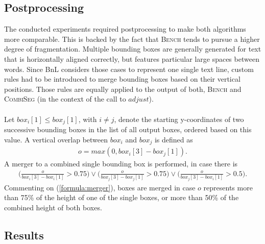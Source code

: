 \documentclass{jdmdh}
\begin{document}
\subsection{Postprocessing} \label{section:post}
The conducted experiments required postprocessing to make both algorithms more comparable. This is backed by the fact that \textsc{Bench} tends to pursue a higher degree of fragmentation. Multiple bounding boxes are generally generated for text that is horizontally aligned correctly, but features particular large spaces between words. Since BnL considers those cases to represent one single text line, custom rules had to be introduced to merge bounding boxes based on their vertical positions. Those rules are equally applied to the output of both, \textsc{Bench} and \textsc{CombiSeg} (in the context of the call to $adjust$). \\ \\
Let $box_i[1]\!\leq\!box_j[1]$, with $i\!\neq\!j$, denote the starting y-coordinates of two successive bounding boxes in the list of all output boxes, ordered based on this value. A vertical overlap between $box_i$ and $box_j$ is defined as
\begin{align}
    o=max(0, box_i[3]-box_j[1]).
\end{align}
A merger to a combined single bounding box is performed, in case there is
\begin{align}
    \Big(\frac{o}{box_i[3]-box_i[1]} > 0.75\Big)\!\lor\!\Big(\frac{o}{box_j[3]-box_j[1]} > 0.75\Big)\!\lor\!\Big(\frac{o}{box_j[3]-box_i[1]} > 0.5\Big). \label{formula:merger}
\end{align}
Commenting on (\ref{formula:merger}), boxes are merged in case $o$ represents more than 75\% of the height of one of the single boxes, or more than 50\% of the combined height of both boxes.
\subsection{Results}
\end{document}
